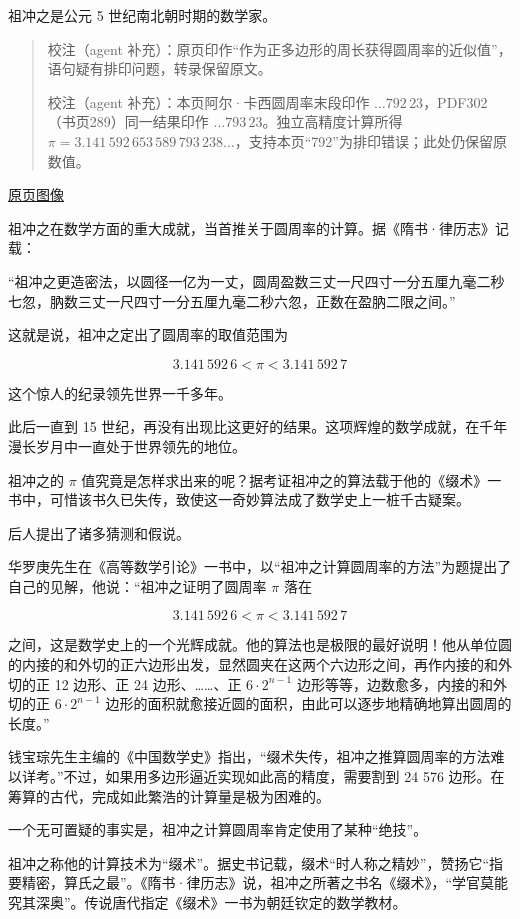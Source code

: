 \documentclass[
  10pt,
  fontset=fandol]{ctexart}
\begin{document}
祖冲之是公元 5 世纪南北朝时期的数学家。

\begin{quote}
校注（agent 补充）：原页印作``作为正多边形的周长获得圆周率的近似值''，语句疑有排印问题，转录保留原文。

校注（agent 补充）：本页阿尔·卡西圆周率末段印作 \(\ldots792\,23\)，PDF302（书页289）同一结果印作 \(\ldots793\,23\)。独立高精度计算所得 \(\pi=3.141\,592\,653\,589\,793\,238\ldots\)，支持本页``792''为排印错误；此处仍保留原数值。
\end{quote}

\href{../../source-images/pdf-295.jpeg}{原页图像}

祖冲之在数学方面的重大成就，当首推关于圆周率的计算。据《隋书·律历志》记载：

``祖冲之更造密法，以圆径一亿为一丈，圆周盈数三丈一尺四寸一分五厘九毫二秒七忽，肭数三丈一尺四寸一分五厘九毫二秒六忽，正数在盈肭二限之间。''

这就是说，祖冲之定出了圆周率的取值范围为

\[
3.141\,592\,6<\pi<3.141\,592\,7
\]

这个惊人的纪录领先世界一千多年。

此后一直到 15 世纪，再没有出现比这更好的结果。这项辉煌的数学成就，在千年漫长岁月中一直处于世界领先的地位。

祖冲之的 \(\pi\) 值究竟是怎样求出来的呢？据考证祖冲之的算法载于他的《缀术》一书中，可惜该书久已失传，致使这一奇妙算法成了数学史上一桩千古疑案。

后人提出了诸多猜测和假说。

华罗庚先生在《高等数学引论》一书中，以``祖冲之计算圆周率的方法''为题提出了自己的见解，他说：``祖冲之证明了圆周率 \(\pi\) 落在

\[
3.141\,592\,6<\pi<3.141\,592\,7
\]

之间，这是数学史上的一个光辉成就。他的算法也是极限的最好说明！他从单位圆的内接的和外切的正六边形出发，显然圆夹在这两个六边形之间，再作内接的和外切的正 12 边形、正 24 边形、\ldots\ldots、正 \(6\cdot2^{n-1}\) 边形等等，边数愈多，内接的和外切的正 \(6\cdot2^{n-1}\) 边形的面积就愈接近圆的面积，由此可以逐步地精确地算出圆周的长度。''

钱宝琮先生主编的《中国数学史》指出，``缀术失传，祖冲之推算圆周率的方法难以详考。''不过，如果用多边形逼近实现如此高的精度，需要割到 24 576 边形。在筹算的古代，完成如此繁浩的计算量是极为困难的。

一个无可置疑的事实是，祖冲之计算圆周率肯定使用了某种``绝技''。

祖冲之称他的计算技术为``缀术''。据史书记载，缀术``时人称之精妙''，赞扬它``指要精密，算氏之最''。《隋书·律历志》说，祖冲之所著之书名《缀术》，``学官莫能究其深奥''。传说唐代指定《缀术》一书为朝廷钦定的数学教材。
\end{document}
